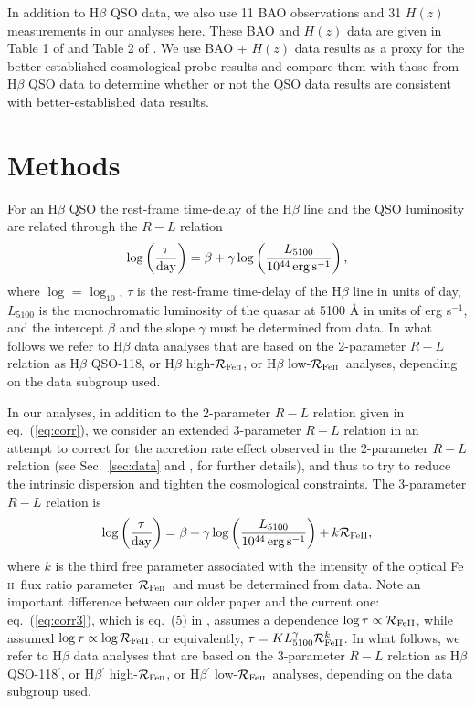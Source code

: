 \documentclass[a4paper,fleqn,usenatbib]{mnras}
\newcommand{\rfe}{${\cal R}_{\rm{Fe\textsc{ii}}}$}
\newcommand{\Feii}{Fe\,\textsc{ii}}
\begin{document}
In addition to H$\beta$ QSO data, we also use 11 BAO observations and 31 $H(z)$ measurements in our analyses here. These BAO and $H(z)$ data are given in Table 1 of \cite{KhadkaRatra2021a} and Table 2 of \cite{Ryanetal2018}. We use BAO + $H(z)$ data results as a proxy for the better-established cosmological probe results and compare them with those from H$\beta$ QSO data to determine whether or not the QSO data results are consistent with better-established data results.

\section{Methods}
\label{sec:methods}

For an H$\beta$ QSO the rest-frame time-delay of the H$\beta$ line and the QSO luminosity are related through the $R-L$ relation \citep{2013ApJ...767..149B}
\begin{equation}
\label{eq:corr}
   \log \left({\frac{\tau} {\rm day}}\right) = \beta + \gamma \log\left({\frac{L_{5100}}{10^{44}\,{\rm erg\,s^{-1}}}}\right),
\end{equation}
where $\log$ = $\log_{10}$, $\tau$ is the rest-frame time-delay of the H$\beta$ line in units of day, $L_{5100}$ is the monochromatic luminosity of the quasar at 5100 {\AA} in units of erg s$^{-1}$, and the intercept $\beta$ and the slope $\gamma$ must be determined from data. In what follows we refer to H$\beta$ data analyses that are based on the 2-parameter $R-L$ relation as H$\beta$ QSO-118, or H$\beta$ high-\rfe, or H$\beta$ low-\rfe\ analyses, depending on the data subgroup used.

In our analyses, in addition to the 2-parameter $R-L$ relation given in eq.\ (\ref{eq:corr}), we consider an extended 3-parameter $R-L$ relation in an attempt to correct for the accretion rate effect observed in the 2-parameter $R-L$ relation (see Sec.~\ref{sec:data} and \citeauthor{Mary2020}, \citeyear{Mary2020} for further details), and thus to try to reduce the intrinsic dispersion and tighten the cosmological constraints. The 3-parameter $R-L$ relation is
\begin{equation}
\label{eq:corr3}
   \log \left({\frac{\tau} {\rm day}}\right) = \beta + \gamma \log\left({\frac{L_{5100}}{10^{44}\,{\rm erg\,s^{-1}}}}\right) + k {\cal R}_{\text{Fe{\sc II}}},
\end{equation}
\citep{duwang_2019} where $k$ is the third free parameter associated with the intensity of the optical \Feii\  flux ratio parameter \rfe\ and must be determined from data. Note an important difference between our older paper \citep{Mary2020} and the current one: eq.~(\ref{eq:corr3}), which is eq.~(5) in \citet{duwang_2019}, assumes a dependence $ \log \tau \propto {\cal R}_{\rm FeII}$, while \citet{Mary2020} assumed $ \log \tau \propto \log {\cal R}_{\rm FeII}$, or equivalently, $\tau=K L_{5100}^{\gamma}{\cal R}_{\rm FeII}^{k}$. In what follows, we refer to H$\beta$ data analyses that are based on the 3-parameter $R-L$ relation as H$\beta$ QSO-118$^\prime$, or H$\beta{}^\prime$ high-\rfe, or H$\beta{}^\prime$ low-\rfe\ analyses, depending on the data subgroup used.
\end{document}
